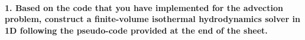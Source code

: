 \paragraph{1. Based on the code that you have 
    implemented for the advection problem, 
    construct a finite-volume isothermal 
    hydrodynamics solver in 1D following the 
    pseudo-code provided at the end of the 
    sheet.
}
